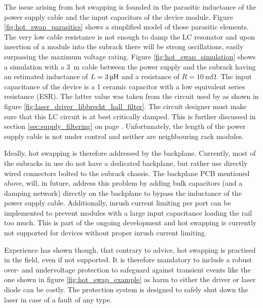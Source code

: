 The issue arising from hot swapping is founded in the parasitic inductance of the power supply cable and the input capacitors of the device module. Figure \ref{fig:hot_swap_parasitics} shows a simplified model of those parasitic elements. The very low cable resistance is not enough to damp the LC resonator and upon insertion of a module into the subrack there will be strong oscillations, easily surpassing the maximum voltage rating. Figure \ref{fig:hot_swap_simulation} shows a simulation with a \qty{3}{\m} cable between the power supply and the subrack having an estimated inductance of $L=\qty{3}{\uH}$ and a resistance of $R=\qty{10}{\milli\ohm}$. The input capacitance of the device is a \qty{1}{\uF} ceramic capacitor with a low equivalent series resistance (ESR). The latter value was taken from the circuit used by \citeauthor{libbrecht_hall} \cite{libbrecht_hall} as shown in figure \ref{fig:laser_driver_libbrecht_hall_filter}. The circuit designer must make sure that this LC circuit is at best critically damped. This is further discussed in section \ref{sec:supply_filtering} on page \pageref{eqn:lc_filter_rd}. Unfortunately, the length of the power supply cable is not under control and neither are neighbouring rack modules.

Ideally, hot swapping is therefore addressed by the backplane. Currently, most of the subracks in use do not have a dedicated backplane, but rather use directly wired connectors bolted to the subrack chassis. The backplane PCB mentioned above, will, in future, address this problem by adding bulk capacitors (and a damping network) directly on the backplane to bypass the inductance of the power supply cable. Additionally, inrush current limiting per port can be implemented to prevent modules with a large input capacitance loading the rail too much. This is part of the ongoing development and hot swapping is currently not supported for devices without proper inrush current limiting.

Experience has shown though, that contrary to advice, hot swapping is practised in the field, even if not supported. It is therefore mandatory to include a robust over- and undervoltage protection to safeguard against transient events like the one shown in figure \ref{fig:hot_swap_example} as harm to either the driver or laser diode can be costly. The protection system is designed to safely shut down the laser in case of a fault of any type.

